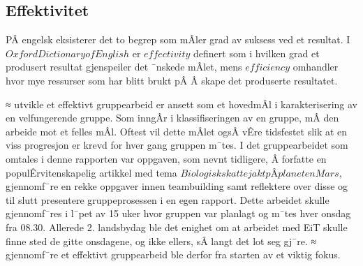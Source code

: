\subsection{Effektivitet}









PÂ engelsk eksisterer det to begrep som mÂler grad av suksess ved et resultat. 
I $Oxford Dictionary of English$ er $effectivity$ definert som i hvilken grad et produsert resultat gjenspeiler det ¯nskede mÂlet, mens $efficiency$ omhandler hvor mye ressurser som har blitt brukt pÂ Â skape det produserte resultatet. 

≈ utvikle et effektivt gruppearbeid er ansett som et hovedmÂl i karakterisering av en velfungerende gruppe. 
Som inngÂr i klassifiseringen av en gruppe, mÂ den arbeide mot et felles mÂl. 
Oftest vil dette mÂlet ogsÂ vÊre tidsfestet slik at en viss progresjon er krevd for hver gang gruppen m¯tes. 
I det gruppearbeidet som omtales i denne rapporten var oppgaven, som nevnt tidligere, Â forfatte en populÊrvitenskapelig artikkel med tema $Biologisk skattejakt pÂ planeten Mars$, gjennomf¯re en rekke oppgaver innen teambuilding samt reflektere over disse og til slutt presentere gruppeprosessen i en egen rapport. 
Dette arbeidet skulle gjennomf¯res i l¯pet av 15 uker hvor gruppen var planlagt og m¯tes hver onsdag fra 08.30. 
Allerede 2. landsbydag ble det enighet om at arbeidet med EiT skulle finne sted de gitte onsdagene, og ikke ellers, sÂ langt det lot seg gj¯re. 
≈ gjennomf¯re et effektivt gruppearbeid ble derfor fra starten av et viktig fokus. 

